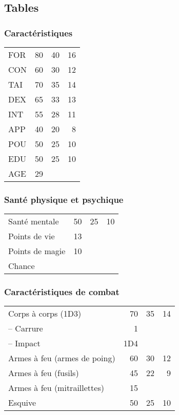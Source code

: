\documentclass[11pt]{article}
\begin{document}
\begin{twocols}
\subsection{Tables}
\label{sec:org9b508fd}
\subsubsection{Caractéristiques}
\label{sec:org484015f}

\begin{center}
\begin{tabular}{lrrr}
FOR & 80 & 40 & 16\\
CON & 60 & 30 & 12\\
TAI & 70 & 35 & 14\\
DEX & 65 & 33 & 13\\
INT & 55 & 28 & 11\\
APP & 40 & 20 & 8\\
POU & 50 & 25 & 10\\
EDU & 50 & 25 & 10\\
AGE & 29 &  & \\
\end{tabular}
\end{center}

\subsubsection{Santé physique et psychique}
\label{sec:org9568a6a}

\begin{center}
\begin{tabular}{lrrr}
Santé mentale & 50 & 25 & 10\\
Points de vie & 13 &  & \\
Points de magie & 10 &  & \\
Chance &  &  & \\
\end{tabular}
\end{center}

\subsubsection{Caractéristiques de combat}
\label{sec:org5a047f4}


\begin{center}
\begin{tabular}{lrrr}
Corps à corps (1D3) & 70 & 35 & 14\\
-- Carrure & 1 &  & \\
-- Impact & 1D4 &  & \\
Armes à feu (armes de poing) & 60 & 30 & 12\\
Armes à feu (fusils) & 45 & 22 & 9\\
Armes à feu (mitraillettes) & 15 &  & \\
Esquive & 50 & 25 & 10\\
\end{tabular}
\end{center}


\end{twocols}
\end{document}
